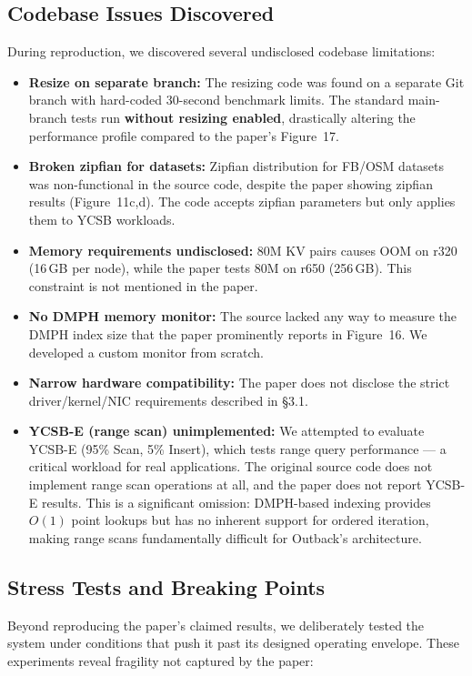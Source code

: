 \documentclass[conference]{IEEEtran}
\begin{document}
\subsection{Codebase Issues Discovered}

During reproduction, we discovered several undisclosed codebase limitations:

\begin{itemize}[nosep]
  \item \textbf{Resize on separate branch:} The resizing code was found on a separate Git branch with hard-coded 30-second benchmark limits. The standard main-branch tests run \textbf{without resizing enabled}, drastically altering the performance profile compared to the paper's Figure~17.
  \item \textbf{Broken zipfian for datasets:} Zipfian distribution for FB/OSM datasets was non-functional in the source code, despite the paper showing zipfian results (Figure~11c,d). The code accepts zipfian parameters but only applies them to YCSB workloads.
  \item \textbf{Memory requirements undisclosed:} 80M KV pairs causes OOM on r320 (16\,GB per node), while the paper tests 80M on r650 (256\,GB). This constraint is not mentioned in the paper.
  \item \textbf{No DMPH memory monitor:} The source lacked any way to measure the DMPH index size that the paper prominently reports in Figure~16. We developed a custom monitor from scratch.
  \item \textbf{Narrow hardware compatibility:} The paper does not disclose the strict driver/kernel/NIC requirements described in \S3.1.
  \item \textbf{YCSB-E (range scan) unimplemented:} We attempted to evaluate YCSB-E (95\% Scan, 5\% Insert), which tests range query performance --- a critical workload for real applications. The original source code does not implement range scan operations at all, and the paper does not report YCSB-E results. This is a significant omission: DMPH-based indexing provides $O(1)$ point lookups but has no inherent support for ordered iteration, making range scans fundamentally difficult for Outback's architecture.
\end{itemize}

\subsection{Stress Tests and Breaking Points}

Beyond reproducing the paper's claimed results, we deliberately tested the system under conditions that push it past its designed operating envelope. These experiments reveal fragility not captured by the paper:
\end{document}
